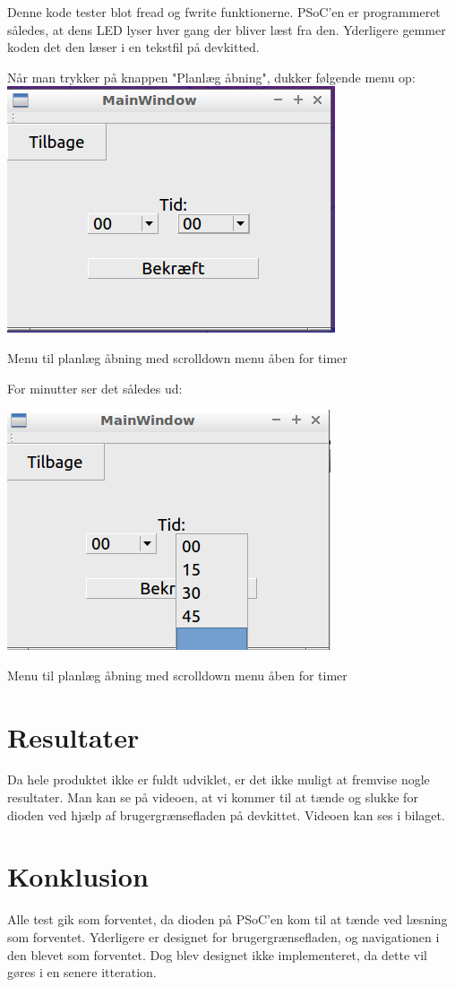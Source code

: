 Denne kode tester blot fread og fwrite funktionerne. PSoC'en er programmeret således, at dens LED lyser hver gang der bliver læst fra den. Yderligere gemmer koden det den læser i en tekstfil på devkitted.

Når man trykker på knappen "Planlæg åbning", dukker følgende menu op:
\includegraphics{Billeder/paMin}
\caption{Menu til planlæg åbning med scrolldown menu åben for timer}

For minutter ser det således ud:

\includegraphics{Billeder/paMinutter}
\caption{Menu til planlæg åbning med scrolldown menu åben for timer}

\section*{Resultater}

Da hele produktet ikke er fuldt udviklet, er det ikke muligt at fremvise nogle resultater. Man kan se på videoen, at vi kommer til at tænde og slukke for dioden ved hjælp af brugergrænsefladen på devkittet. Videoen kan ses i bilaget.

\section*{Konklusion}

Alle test gik som forventet, da dioden på PSoC'en kom til at tænde ved læsning som forventet. Yderligere er designet for brugergrænsefladen, og navigationen i den blevet som forventet. Dog blev designet ikke implementeret, da dette vil gøres i en senere itteration.